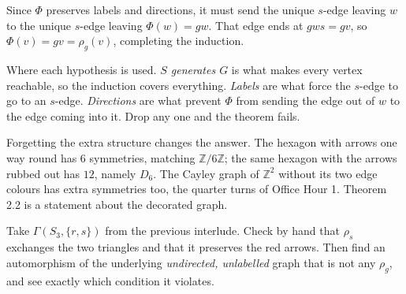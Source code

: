 \documentclass[10pt]{article}
\newcommand{\Z}{\mathbb{Z}}
\begin{document}
{\begin{minipage}[t]{744pt}
\begin{minipage}[t]{356pt}
{
}\par\vspace{2pt}
Since $\Phi$ preserves labels and directions, it must send the unique $s$-edge leaving $w$ to the unique $s$-edge leaving $\Phi(w)=gw$. That edge ends at $gws=gv$, so $\Phi(v)=gv=\rho_g(v)$, completing the induction.
\begin{why}
Where each hypothesis is used. \emph{$S$ generates $G$} is what makes every vertex reachable, so the induction covers everything. \emph{Labels} are what force the $s$-edge to go to an $s$-edge. \emph{Directions} are what prevent $\Phi$ from sending the edge out of $w$ to the edge coming into it. Drop any one and the theorem fails.
\end{why}
\begin{pitfall}
Forgetting the extra structure changes the answer. The hexagon with arrows one way round has $6$ symmetries, matching $\Z/6\Z$; the same hexagon with the arrows rubbed out has $12$, namely $D_6$. The Cayley graph of $\Z^2$ without its two edge colours has extra symmetries too, the quarter turns of Office Hour 1. Theorem 2.2 is a statement about the decorated graph.
\end{pitfall}
\begin{tryit}
Take $\Gamma(S_3,\{r,s\})$ from the previous interlude. Check by hand that $\rho_s$ exchanges the two triangles and that it preserves the red arrows. Then find an automorphism of the underlying \emph{undirected, unlabelled} graph that is not any $\rho_g$, and see exactly which condition it violates.
\end{tryit}
\end{minipage}
\end{minipage}
}
\end{document}
